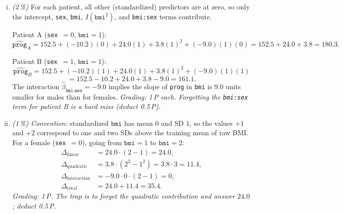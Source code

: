 \documentclass[11pt,a4paper]{article}
\newcommand{\subpoints}[1]{\textit{(#1\,\%)}}
\begin{document}
\begin{enumerate}[(i)]
  \item \subpoints{2} For each patient, all other (standardized) predictors are at zero, so only
        the intercept, \texttt{sex}, \texttt{bmi}, $I(\texttt{bmi}^2)$, and \texttt{bmi:sex}
        terms contribute.

        Patient A (\texttt{sex}~$= 0$, $\texttt{bmi} = 1$):
        $$\widehat{\texttt{prog}}_A = 152.5 + (-10.2)(0) + 24.0(1) + 3.8(1)^2 + (-9.0)(1)(0)
          = 152.5 + 24.0 + 3.8 = \boxed{180.3}.$$

        Patient B (\texttt{sex}~$= 1$, $\texttt{bmi} = 1$):
        $$\widehat{\texttt{prog}}_B = 152.5 + (-10.2)(1) + 24.0(1) + 3.8(1)^2 + (-9.0)(1)(1)$$
        $$= 152.5 - 10.2 + 24.0 + 3.8 - 9.0 = \boxed{161.1}.$$
        The interaction $\hat\beta_{\texttt{bmi:sex}} = -9.0$ implies the slope of \texttt{prog}
        in \texttt{bmi} is $9.0$ units smaller for males than for females.
        \emph{Grading: 1\,P each. Forgetting the \texttt{bmi:sex} term for patient B is a hard
        miss (deduct 0.5\,P).}

  \item \subpoints{1} \emph{Convention:} standardized $\texttt{bmi}$ has mean $0$ and SD $1$,
        so the values $+1$ and $+2$ correspond to one and two SDs above the training mean of
        raw BMI. For a female (\texttt{sex}~$=0$), going from $\texttt{bmi} = 1$ to $\texttt{bmi} = 2$:
        \begin{align*}
        \Delta_\text{linear}    &= 24.0 \cdot (2 - 1) = 24.0, \\
        \Delta_\text{quadratic} &= 3.8 \cdot (2^2 - 1^2) = 3.8 \cdot 3 = 11.4, \\
        \Delta_\text{interaction} &= -9.0 \cdot 0 \cdot (2 - 1) = 0, \\
        \Delta_\text{total}     &= 24.0 + 11.4 = \boxed{35.4}.
        \end{align*}
        \emph{Grading: 1\,P. The trap is to forget the quadratic contribution and answer
        $24.0$; deduct 0.5\,P.}
\end{enumerate}
\end{document}
